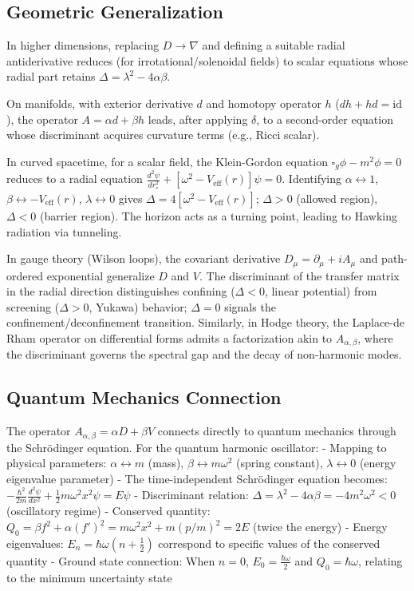 \documentclass[11pt]{article}
\begin{document}
\subsection{Geometric Generalization}
In higher dimensions, replacing $D \to \nabla$ and defining a suitable radial antiderivative reduces (for irrotational/solenoidal fields) to scalar equations whose radial part retains $\Delta = \lambda^2 - 4\alpha\beta$.

On manifolds, with exterior derivative $d$ and homotopy operator $h$ ($dh+hd=\mathrm{id}$), the operator $A = \alpha d + \beta h$ leads, after applying $\delta$, to a second-order equation whose discriminant acquires curvature terms (e.g., Ricci scalar).

In curved spacetime, for a scalar field, the Klein-Gordon equation $\square_g\phi - m^2\phi = 0$ reduces to a radial equation $\frac{d^2\psi}{dr_*^2} + [\omega^2 - V_{\text{eff}}(r)]\psi = 0$. Identifying $\alpha\leftrightarrow1$, $\beta\leftrightarrow -V_{\text{eff}}(r)$, $\lambda\leftrightarrow0$ gives $\Delta = 4[\omega^2 - V_{\text{eff}}(r)]$; $\Delta>0$ (allowed region), $\Delta<0$ (barrier region). The horizon acts as a turning point, leading to Hawking radiation via tunneling.

In gauge theory (Wilson loops), the covariant derivative $D_\mu = \partial_\mu + iA_\mu$ and path-ordered exponential generalize $D$ and $V$. The discriminant of the transfer matrix in the radial direction distinguishes confining ($\Delta<0$, linear potential) from screening ($\Delta>0$, Yukawa) behavior; $\Delta=0$ signals the confinement/deconfinement transition. Similarly, in Hodge theory, the Laplace-de Rham operator on differential forms admits a factorization akin to $A_{\alpha,\beta}$, where the discriminant governs the spectral gap and the decay of non-harmonic modes.

\subsection{Quantum Mechanics Connection}
The operator $A_{\alpha,\beta} = \alpha D + \beta V$ connects directly to quantum mechanics through the Schrödinger equation. For the quantum harmonic oscillator:
- Mapping to physical parameters: $\alpha \leftrightarrow m$ (mass), $\beta \leftrightarrow m\omega^2$ (spring constant), $\lambda \leftrightarrow 0$ (energy eigenvalue parameter)
- The time-independent Schrödinger equation becomes: $-\frac{\hbar^2}{2m}\frac{d^2\psi}{dx^2} + \frac{1}{2}m\omega^2 x^2 \psi = E\psi$
- Discriminant relation: $\Delta = \lambda^2 - 4\alpha\beta = -4m^2\omega^2 < 0$ (oscillatory regime)
- Conserved quantity: $Q_0 = \beta f^2 + \alpha (f')^2 = m\omega^2 x^2 + m (p/m)^2 = 2E$ (twice the energy)
- Energy eigenvalues: $E_n = \hbar\omega(n + \frac{1}{2})$ correspond to specific values of the conserved quantity
- Ground state connection: When $n=0$, $E_0 = \frac{\hbar\omega}{2}$ and $Q_0 = \hbar\omega$, relating to the minimum uncertainty state
\end{document}
